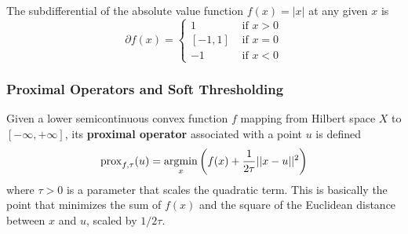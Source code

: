     \begin{example}
      The subdifferential of the absolute value function $f(x) = |x|$ at any given $x$ is 
      \begin{equation}
        \partial f(x) = \begin{cases} 1 & \text{ if } x > 0 \\ [-1, 1] & \text{ if } x = 0 \\ -1 & \text{ if } x < 0 \end{cases}
      \end{equation}
    \end{example}

  \subsubsection{Proximal Operators and Soft Thresholding}

    \begin{definition}
      Given a lower semicontinuous convex function $f$ mapping from Hilbert space $X$ to $[-\infty, +\infty]$, its \textbf{proximal operator} associated with a point $u$ is defined 
      \begin{equation}
        \prox_{f, \tau} (u) = \argmin_{x} \bigg( f(x) + \frac{1}{2\tau} ||x - u||^2 \bigg)
      \end{equation}
      where $\tau > 0$ is a parameter that scales the quadratic term. This is basically the point that minimizes the sum of $f(x)$ and the square of the Euclidean distance between $x$ and $u$, scaled by $1/2\tau$. 
    \end{definition}

